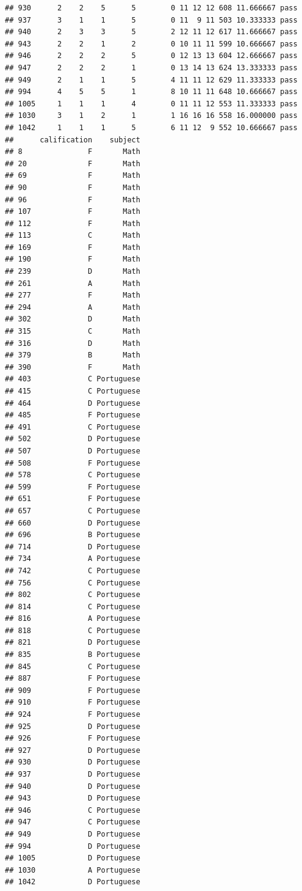 \documentclass[]{article}
\begin{document}
\begin{verbatim}
## 930      2    2    5      5        0 11 12 12 608 11.666667 pass
## 937      3    1    1      5        0 11  9 11 503 10.333333 pass
## 940      2    3    3      5        2 12 11 12 617 11.666667 pass
## 943      2    2    1      2        0 10 11 11 599 10.666667 pass
## 946      2    2    2      5        0 12 13 13 604 12.666667 pass
## 947      2    2    2      1        0 13 14 13 624 13.333333 pass
## 949      2    1    1      5        4 11 11 12 629 11.333333 pass
## 994      4    5    5      1        8 10 11 11 648 10.666667 pass
## 1005     1    1    1      4        0 11 11 12 553 11.333333 pass
## 1030     3    1    2      1        1 16 16 16 558 16.000000 pass
## 1042     1    1    1      5        6 11 12  9 552 10.666667 pass
##      calification    subject
## 8               F       Math
## 20              F       Math
## 69              F       Math
## 90              F       Math
## 96              F       Math
## 107             F       Math
## 112             F       Math
## 113             C       Math
## 169             F       Math
## 190             F       Math
## 239             D       Math
## 261             A       Math
## 277             F       Math
## 294             A       Math
## 302             D       Math
## 315             C       Math
## 316             D       Math
## 379             B       Math
## 390             F       Math
## 403             C Portuguese
## 415             C Portuguese
## 464             D Portuguese
## 485             F Portuguese
## 491             C Portuguese
## 502             D Portuguese
## 507             D Portuguese
## 508             F Portuguese
## 578             C Portuguese
## 599             F Portuguese
## 651             F Portuguese
## 657             C Portuguese
## 660             D Portuguese
## 696             B Portuguese
## 714             D Portuguese
## 734             A Portuguese
## 742             C Portuguese
## 756             C Portuguese
## 802             C Portuguese
## 814             C Portuguese
## 816             A Portuguese
## 818             C Portuguese
## 821             D Portuguese
## 835             B Portuguese
## 845             C Portuguese
## 887             F Portuguese
## 909             F Portuguese
## 910             F Portuguese
## 924             F Portuguese
## 925             D Portuguese
## 926             F Portuguese
## 927             D Portuguese
## 930             D Portuguese
## 937             D Portuguese
## 940             D Portuguese
## 943             D Portuguese
## 946             C Portuguese
## 947             C Portuguese
## 949             D Portuguese
## 994             D Portuguese
## 1005            D Portuguese
## 1030            A Portuguese
## 1042            D Portuguese
\end{verbatim}
\end{document}
